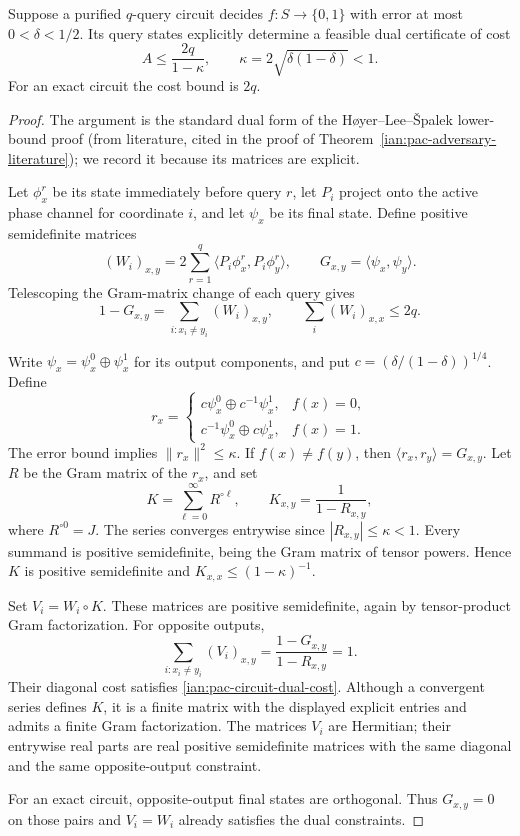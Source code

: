 \begin{lemma}
\label{ian:pac-circuit-to-dual}
Suppose a purified \(q\)-query circuit decides
\(f:S\to\{0,1\}\) with error at most
\(0<\delta<1/2\). Its query states explicitly determine a feasible
dual certificate of cost
\[
 A\le\frac{2q}{1-\kappa},
 \qquad \kappa=2\sqrt{\delta(1-\delta)}<1.
 \tag{32.16}\label{ian:pac-circuit-dual-cost}
\]
For an exact circuit the cost bound is \(2q\).
\end{lemma}

\begin{proof}
The argument is the standard dual form of the H{\o}yer--Lee--{\v S}palek lower-bound proof (from literature, cited in the proof of Theorem~\ref{ian:pac-adversary-literature}); we record it because its matrices are explicit.

Let \(\phi_x^r\) be its state immediately before query \(r\),
let \(P_i\) project onto the active phase channel for coordinate
\(i\), and let \(\psi_x\) be its final state.
Define positive semidefinite matrices
\[
 (W_i)_{x,y}
   =2\sum_{r=1}^q
       \langle P_i\phi_x^r,P_i\phi_y^r\rangle,
 \qquad
 G_{x,y}=\langle\psi_x,\psi_y\rangle.
\]
Telescoping the Gram-matrix change of each query gives
\[
 1-G_{x,y}
   =\sum_{i:x_i\ne y_i}(W_i)_{x,y},
 \qquad
 \sum_i(W_i)_{x,x}\le2q.
 \tag{32.17}
\]

Write \(\psi_x=\psi_x^0\oplus\psi_x^1\) for its output components,
and put \(c=(\delta/(1-\delta))^{1/4}\).
Define
\[
 r_x=
 \begin{cases}
 c\psi_x^0\oplus c^{-1}\psi_x^1,&f(x)=0,\\
 c^{-1}\psi_x^0\oplus c\psi_x^1,&f(x)=1.
 \end{cases}
\]
The error bound implies \(\|r_x\|^2\le\kappa\).
If \(f(x)\ne f(y)\), then
\(\langle r_x,r_y\rangle=G_{x,y}\).
Let \(R\) be the Gram matrix of the \(r_x\), and set
\[
 K=\sum_{\ell=0}^\infty R^{\circ\ell},
 \qquad K_{x,y}=\frac1{1-R_{x,y}},
\]
where \(R^{\circ0}=J\).
The series converges entrywise since \(|R_{x,y}|\le\kappa<1\).
Every summand is positive semidefinite, being the Gram matrix of
tensor powers. Hence \(K\) is positive semidefinite and
\(K_{x,x}\le(1-\kappa)^{-1}\).

Set \(V_i=W_i\circ K\). These matrices are positive semidefinite,
again by tensor-product Gram factorization.
For opposite outputs,
\[
 \sum_{i:x_i\ne y_i}(V_i)_{x,y}
   =\frac{1-G_{x,y}}{1-R_{x,y}}=1.
\]
Their diagonal cost satisfies \eqref{ian:pac-circuit-dual-cost}.
Although a convergent series defines \(K\), it is a finite matrix
with the displayed explicit entries and admits a finite Gram
factorization. The matrices \(V_i\) are Hermitian; their entrywise real parts are real positive semidefinite matrices with the same diagonal and the same opposite-output constraint.

For an exact circuit, opposite-output final states are orthogonal.
Thus \(G_{x,y}=0\) on those pairs and \(V_i=W_i\) already satisfies
the dual constraints.
\end{proof}

